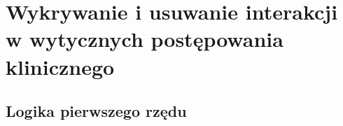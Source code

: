 \section{Wykrywanie i usuwanie interakcji w wytycznych postępowania klinicznego}


\subsection{Logika pierwszego rzędu}



